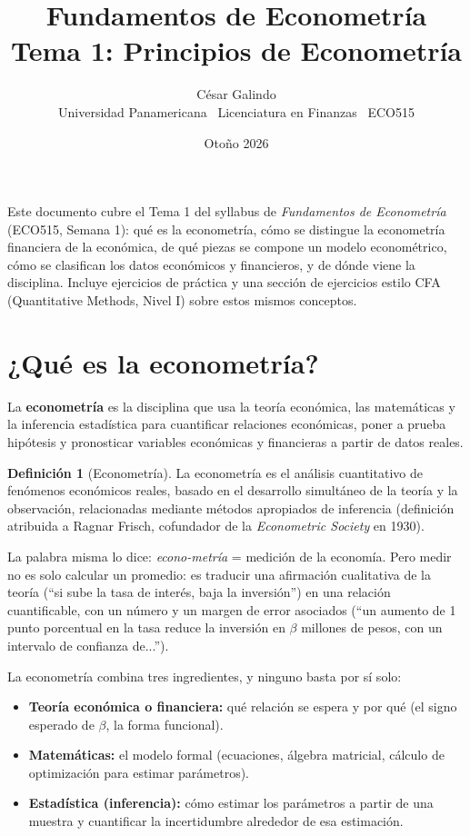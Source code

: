 \documentclass[11pt,a4paper,oneside]{article}
\title{\vspace{-1.5cm}\textbf{\Large Fundamentos de Econometría}\\[2pt]\large Tema 1: Principios de Econometría}
\author{César Galindo\\ \small Universidad Panamericana \textperiodcentered\ Licenciatura en Finanzas \textperiodcentered\ ECO515}
\date{\small Otoño 2026}
\theoremstyle{definition}
\newtheorem{definition}{Definición}[section]
\begin{document}
\maketitle

\begin{ideaBox}
Este documento cubre el Tema 1 del syllabus de \emph{Fundamentos de Econometría}
(ECO515, Semana 1): qué es la econometría, cómo se distingue la econometría
financiera de la económica, de qué piezas se compone un modelo econométrico,
cómo se clasifican los datos económicos y financieros, y de dónde viene la
disciplina. Incluye ejercicios de práctica y una sección de ejercicios estilo
CFA (Quantitative Methods, Nivel I) sobre estos mismos conceptos.
\end{ideaBox}

\tableofcontents

\section{¿Qué es la econometría?}

La \textbf{econometría} es la disciplina que usa la teoría económica, las
matemáticas y la inferencia estadística para cuantificar relaciones
económicas, poner a prueba hipótesis y pronosticar variables económicas y
financieras a partir de datos reales.

\begin{definition}[Econometría]
La econometría es el análisis cuantitativo de fenómenos económicos reales,
basado en el desarrollo simultáneo de la teoría y la observación, relacionadas
mediante métodos apropiados de inferencia (definición atribuida a Ragnar
Frisch, cofundador de la \emph{Econometric Society} en 1930).
\end{definition}

La palabra misma lo dice: \emph{econo-metría} = medición de la economía. Pero
medir no es solo calcular un promedio: es traducir una afirmación cualitativa
de la teoría (``si sube la tasa de interés, baja la inversión'') en una
relación cuantificable, con un número y un margen de error asociados
(``un aumento de 1 punto porcentual en la tasa reduce la inversión en
$\beta$ millones de pesos, con un intervalo de confianza de...'').

\begin{summaryBox}
La econometría combina tres ingredientes, y ninguno basta por sí solo:
\begin{itemize}[nosep]
\item \textbf{Teoría económica o financiera:} qué relación se espera y por qué (el signo esperado de $\beta$, la forma funcional).
\item \textbf{Matemáticas:} el modelo formal (ecuaciones, álgebra matricial, cálculo de optimización para estimar parámetros).
\item \textbf{Estadística (inferencia):} cómo estimar los parámetros a partir de una muestra y cuantificar la incertidumbre alrededor de esa estimación.
\end{itemize}
\end{summaryBox}
\end{document}

